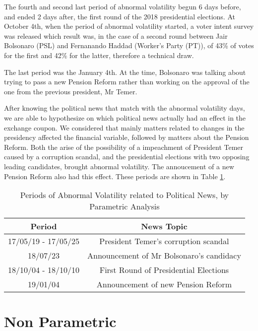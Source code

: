 \documentclass[cic,tc, english]{iiufrgs}
\begin{document}
    The fourth and second last period of abnormal volatility begun 6 days before, and ended 2 days after, the first round of the 2018 presidential elections. At October 4th, when the period of abnormal volatility started, a voter intent survey was released which result was, in the case of a second round between Jair Bolsonaro (PSL) and Fernanando Haddad (Worker's Party (PT)), of 43\% of votes for the first and 42\% for the latter, therefore a technical draw.

    The last period was the January 4th. At the time, Bolsonaro was talking about trying to pass a new Pension Reform rather than working on the approval of the one from the previous president, Mr Temer.

    After knowing the political news that match with the abnormal volatility days, we are able to hypothesize on which political news actually had an effect in the exchange coupon. We considered that mainly matters related to changes in the presidency affected the financial variable, followed by matters about the Pension Reform. Both the arise of the possibility of a impeachment of President Temer caused by a corruption scandal, and the presidential elections with two opposing leading candidates, brought abnormal volatility. The annoucement of a new Pension Reform also had this effect. These periods are shown in Table \ref{tab:respar}.

    \begin{table}[H]
        \caption{Periods of Abnormal Volatility related to Political News, by Parametric Analysis}
        \label{tab:respar}
        \centering
        \begin{tabular}{| c | c |}
            \hline
            Period & News Topic \\
            \hline \hline
            17/05/19 - 17/05/25 & President Temer's corruption scandal \\
            \hline
            18/07/23 & Announcement of Mr Bolsonaro's candidacy \\
            \hline
            18/10/04 - 18/10/10 & First Round of Presidential Elections \\
            \hline
            19/01/04 & Announcement of new Pension Reform \\
            \hline
        \end{tabular}
    \end{table}

\section{Non Parametric}
\end{document}
